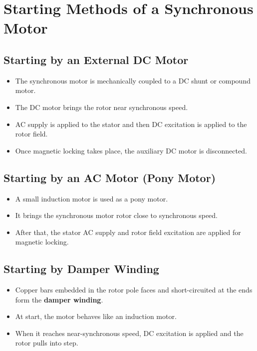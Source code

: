 \documentclass[12pt,a4paper]{article}
\begin{document}
\section{Starting Methods of a Synchronous Motor}

\subsection{Starting by an External DC Motor}

\begin{itemize}[leftmargin=*]
  \item The synchronous motor is mechanically coupled to a DC shunt or compound motor.
  \item The DC motor brings the rotor near synchronous speed.
  \item AC supply is applied to the stator and then DC excitation is applied to the rotor field.
  \item Once magnetic locking takes place, the auxiliary DC motor is disconnected.
\end{itemize}

\subsection{Starting by an AC Motor (Pony Motor)}

\begin{itemize}[leftmargin=*]
  \item A small induction motor is used as a pony motor.
  \item It brings the synchronous motor rotor close to synchronous speed.
  \item After that, the stator AC supply and rotor field excitation are applied for magnetic locking.
\end{itemize}

\subsection{Starting by Damper Winding}

\begin{itemize}[leftmargin=*]
  \item Copper bars embedded in the rotor pole faces and short-circuited at the ends form the \textbf{damper winding}.
  \item At start, the motor behaves like an induction motor.
  \item When it reaches near-synchronous speed, DC excitation is applied and the rotor pulls into step.
\end{itemize}
\end{document}
